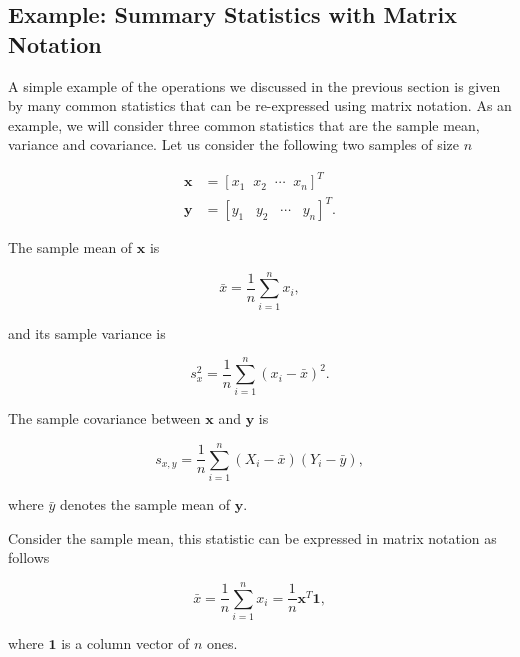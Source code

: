 \documentclass[12pt,]{krantz}
\begin{document}
\subsection{Example: Summary Statistics with Matrix
Notation}\label{example-summary-statistics-with-matrix-notation}

A simple example of the operations we discussed in the previous section
is given by many common statistics that can be re-expressed using matrix
notation. As an example, we will consider three common statistics that
are the sample mean, variance and covariance. Let us consider the
following two samples of size \(n\)

\begin{equation*}
  \begin{aligned}
    \mathbf{x} &= \left[x_1 \;\; x_2 \; \;\cdots \;\; x_n\right]^T\\
    \mathbf{y} &= \left[y_1 \;\;\; y_2 \; \;\;\cdots \;\;\; y_n\right]^T.
  \end{aligned}
\end{equation*}

The sample mean of \(\mathbf{x}\) is

\begin{equation*}
  \bar{x} = \frac{1}{n} \sum_{i = 1}^{n} x_i,
\end{equation*}

and its sample variance is

\begin{equation*}
  s_x^2 = \frac{1}{n} \sum_{i = 1}^n \left(x_i - \bar{x}\right)^2.
\end{equation*}

The sample covariance between \(\mathbf{x}\) and \(\mathbf{y}\) is

\begin{equation*}
  s_{x,y} = \frac{1}{n} \sum_{i = 1}^n \left(X_i - \bar{x}\right) \left(Y_i - \bar{y}\right),
\end{equation*}

where \(\bar{y}\) denotes the sample mean of \(\mathbf{y}\).

Consider the sample mean, this statistic can be expressed in matrix
notation as follows

\begin{equation*}
  \bar{x} = \frac{1}{n} \sum_{i = 1}^{n} x_i =  \frac{1}{n} \mathbf{x}^T \mathbf{1},
\end{equation*}

where \(\mathbf{1}\) is a column vector of \(n\) ones.
\end{document}
